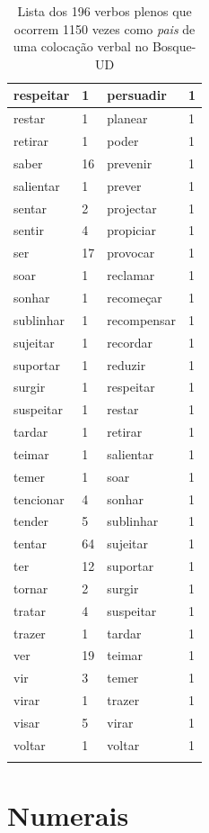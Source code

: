 \documentclass[output=paper,colorlinks,citecolor=brown]{langscibook}
\begin{document}
\begin{longtable}{ p{3cm} | p{1cm} | p{3cm} | p{1cm} }
			respeitar & 1 & persuadir & 1\\\hline
			restar & 1 & planear & 1\\\hline
			retirar & 1 & poder & 1\\\hline
			saber & 16 & prevenir & 1\\\hline
			salientar & 1 & prever & 1\\\hline
			sentar & 2 & projectar & 1\\\hline
			sentir & 4 & propiciar & 1\\\hline
			ser & 17 & provocar & 1\\\hline
			soar & 1 & reclamar & 1\\\hline
			sonhar & 1 & recomeçar & 1\\\hline
			sublinhar & 1 & recompensar & 1\\\hline
			sujeitar & 1 & recordar & 1\\\hline
			suportar & 1 & reduzir & 1\\\hline
			surgir & 1 & respeitar & 1\\\hline
			suspeitar & 1 & restar & 1\\\hline
			tardar & 1 & retirar & 1\\\hline
			teimar & 1 & salientar & 1\\\hline
			temer & 1 & soar & 1\\\hline
			tencionar & 4 & sonhar & 1\\\hline
			tender & 5 & sublinhar & 1\\\hline
			tentar & 64 & sujeitar & 1\\\hline
			ter & 12 & suportar & 1\\\hline
			tornar & 2 & surgir & 1\\\hline
			tratar & 4 & suspeitar & 1\\\hline
			trazer & 1 & tardar & 1\\\hline
			ver & 19 & teimar & 1\\\hline
			vir & 3 & temer & 1\\\hline
			virar & 1 & trazer & 1\\\hline
			visar & 5 & virar & 1\\\hline
			voltar & 1 & voltar & 1\\\hline
			\caption{Lista dos 196 verbos plenos que ocorrem 1150 vezes como \emph{pais} de uma colocação verbal no Bosque-UD}
			\label{tab:nãolocverbal}
		\end{longtable}


\section{Numerais}\label{sec:numerais}
\end{document}
